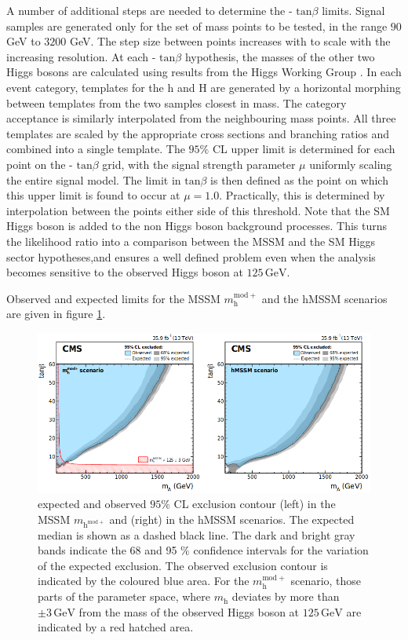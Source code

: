 A number of additional steps are needed to determine the \ma -  $\mathrm{tan}\beta$ limits. Signal samples are generated only for the set of \ma mass points to be tested, in the range $90$ GeV to $3200$ GeV. The step size between points increases with \ma to scale with the increasing \mttot resolution. At each \ma -  $\mathrm{tan}\beta$ hypothesis, the masses of the other two Higgs bosons are calculated using results from the Higgs Working Group \cite{Dittmaier:1318996}. In each event category, templates for the h and H are generated by a horizontal morphing \cite{READ1999357} between templates from the two samples
closest in mass. The category acceptance is similarly interpolated from the neighbouring mass
points. All three templates are scaled by the appropriate cross sections and branching ratios and
combined into a single template. The $95\%$ CL upper limit is determined for each point on the \ma -  $\mathrm{tan}\beta$ grid, with the signal strength parameter $\mu$ uniformly scaling the entire signal model. The limit in  $\mathrm{tan}\beta$ is then defined as the point on which this upper limit is found to occur at $\mu = 1.0$. Practically, this is determined by interpolation between the points either side of this threshold. Note that the SM Higgs boson is added to the non Higgs boson background processes.  This turns the likelihood ratio into a comparison between the MSSM and the SM Higgs sector hypotheses,and ensures a well defined problem even when the analysis becomes sensitive to the observed Higgs boson at $125\,\mathrm{GeV}$.

Observed and expected limits for the MSSM $m_{\mathrm{h}}^{\mathrm{mod}+}$ and the hMSSM scenarios are given in figure \ref{fig:limits}.

\begin{figure}
    \centering
    \includegraphics[width=\textwidth]{Images/MSSMlimits.png}
    \caption{expected and observed $95\%$ CL exclusion contour (left) in the MSSM $m_{\mathrm{h}^{\mathrm{mod}+}}$ and (right) in the hMSSM scenarios. The expected median is shown as a dashed black line. The dark and bright gray bands indicate the 68 and 95 $\%$ confidence intervals for the variation of the expected exclusion. The observed exclusion contour is indicated by the coloured blue area. For the $m_{\mathrm{h}}^{\mathrm{mod}+}$ scenario, those parts of the parameter space, where $m_{\mathrm{h}}$ deviates by more than $\pm 3 \,\mathrm{GeV}$ from the mass of the observed Higgs boson at $125\,\mathrm{GeV}$ are indicated by a red hatched area.}
    \label{fig:limits}
\end{figure}

